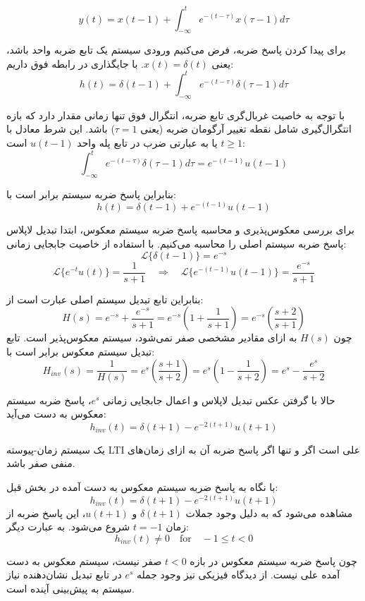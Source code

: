 
\[
y(t) = x(t - 1) + \int_{-\infty}^{t} e^{-(t-\tau)} x(\tau - 1) d\tau
\]

برای پیدا کردن پاسخ ضربه، فرض می‌کنیم ورودی سیستم یک تابع ضربه واحد باشد، یعنی $x(t) = \delta(t)$. با جایگذاری در رابطه فوق داریم:
\[
h(t) = \delta(t - 1) + \int_{-\infty}^{t} e^{-(t-\tau)} \delta(\tau - 1) d\tau
\]

با توجه به خاصیت غربال‌گری تابع ضربه، انتگرال فوق تنها زمانی مقدار دارد که بازه انتگرال‌گیری شامل نقطه تغییر آرگومان ضربه (یعنی $\tau = 1$) باشد. این شرط معادل با $t \ge 1$ یا به عبارتی ضرب در تابع پله واحد $u(t - 1)$ است:
\[
\int_{-\infty}^{t} e^{-(t-\tau)} \delta(\tau - 1) d\tau = e^{-(t-1)} u(t - 1)
\]

بنابراین پاسخ ضربه سیستم برابر است با:
\[
h(t) = \delta(t - 1) + e^{-(t-1)} u(t - 1)
\]


برای بررسی معکوس‌پذیری و محاسبه پاسخ ضربه سیستم معکوس، ابتدا تبدیل لاپلاس پاسخ ضربه سیستم اصلی را محاسبه می‌کنیم. 
با استفاده از خاصیت جابجایی زمانی:
\[
\mathcal{L}\{\delta(t-1)\} = e^{-s}
\]
\[
\mathcal{L}\{e^{-t} u(t)\} = \frac{1}{s + 1} \quad \Rightarrow \quad \mathcal{L}\{e^{-(t-1)} u(t-1)\} = \frac{e^{-s}}{s + 1}
\]

بنابراین تابع تبدیل سیستم اصلی عبارت است از:
\[
H(s) = e^{-s} + \frac{e^{-s}}{s + 1} = e^{-s} \left( 1 + \frac{1}{s + 1} \right) = e^{-s} \left( \frac{s + 2}{s + 1} \right)
\]
چون $H(s)$ به ازای مقادیر مشخصی صفر نمی‌شود، سیستم معکوس‌پذیر است. تابع تبدیل سیستم معکوس برابر است با:
\[
H_{inv}(s) = \frac{1}{H(s)} = e^{s} \left( \frac{s + 1}{s + 2} \right) = e^{s} \left( 1 - \frac{1}{s + 2} \right) = e^{s} - \frac{e^{s}}{s + 2}
\]

حالا با گرفتن عکس تبدیل لاپلاس و اعمال جابجایی زمانی $e^{s}$، پاسخ ضربه سیستم معکوس به دست می‌آید:
\[
h_{inv}(t) = \delta(t + 1) - e^{-2(t + 1)} u(t + 1)
\]

\pagebreak


یک سیستم زمان-پیوسته LTI علی است اگر و تنها اگر پاسخ ضربه آن به ازای زمان‌های منفی صفر باشد.

با نگاه به پاسخ ضربه سیستم معکوس به دست آمده در بخش قبل:
\[
h_{inv}(t) = \delta(t + 1) - e^{-2(t + 1)} u(t + 1)
\]
مشاهده می‌شود که به دلیل وجود جملات $\delta(t + 1)$ و $u(t + 1)$، این پاسخ ضربه از زمان $t = -1$ شروع می‌شود. به عبارت دیگر:
\[
h_{inv}(t) \neq 0 \quad \text{for} \quad -1 \le t < 0
\]

چون پاسخ ضربه سیستم معکوس در بازه $t < 0$ صفر نیست، سیستم معکوس به دست آمده {علی نیست}. از دیدگاه فیزیکی نیز وجود جمله $e^s$ در تابع تبدیل نشان‌دهنده نیاز سیستم به پیش‌بینی آینده است.
